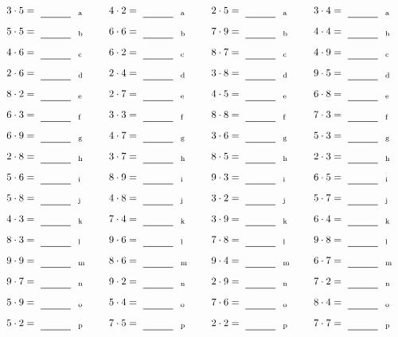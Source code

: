 \documentclass
[
  draft    = true,
  fontsize = 11pt,
  parskip  = half-
]
{scrartcl}
\begin{document}
\par\vfill\par
\begin{align*}
    \pline{3\cdot5}&=\rline{a}
  & \pline{4\cdot2}&=\rline{a}
  & \pline{2\cdot5}&=\rline{a}
  & \pline{3\cdot4}&=\rline{a} \\[1ex]
    \pline{5\cdot5}&=\rline{b}
  & \pline{6\cdot6}&=\rline{b}
  & \pline{7\cdot9}&=\rline{b}
  & \pline{4\cdot4}&=\rline{b} \\[1ex]
    \pline{4\cdot6}&=\rline{c}
  & \pline{6\cdot2}&=\rline{c}
  & \pline{8\cdot7}&=\rline{c}
  & \pline{4\cdot9}&=\rline{c} \\[1ex]
    \pline{2\cdot6}&=\rline{d}
  & \pline{2\cdot4}&=\rline{d}
  & \pline{3\cdot8}&=\rline{d}
  & \pline{9\cdot5}&=\rline{d} \\[1ex]
    \pline{8\cdot2}&=\rline{e}
  & \pline{2\cdot7}&=\rline{e}
  & \pline{4\cdot5}&=\rline{e}
  & \pline{6\cdot8}&=\rline{e} \\[1ex]
    \pline{6\cdot3}&=\rline{f}
  & \pline{3\cdot3}&=\rline{f}
  & \pline{8\cdot8}&=\rline{f}
  & \pline{7\cdot3}&=\rline{f} \\[1ex]
    \pline{6\cdot9}&=\rline{g}
  & \pline{4\cdot7}&=\rline{g}
  & \pline{3\cdot6}&=\rline{g}
  & \pline{5\cdot3}&=\rline{g} \\[1ex]
    \pline{2\cdot8}&=\rline{h}
  & \pline{3\cdot7}&=\rline{h}
  & \pline{8\cdot5}&=\rline{h}
  & \pline{2\cdot3}&=\rline{h} \\[1ex]
    \pline{5\cdot6}&=\rline{i}
  & \pline{8\cdot9}&=\rline{i}
  & \pline{9\cdot3}&=\rline{i}
  & \pline{6\cdot5}&=\rline{i} \\[1ex]
    \pline{5\cdot8}&=\rline{j}
  & \pline{4\cdot8}&=\rline{j}
  & \pline{3\cdot2}&=\rline{j}
  & \pline{5\cdot7}&=\rline{j} \\[1ex]
    \pline{4\cdot3}&=\rline{k}
  & \pline{7\cdot4}&=\rline{k}
  & \pline{3\cdot9}&=\rline{k}
  & \pline{6\cdot4}&=\rline{k} \\[1ex]
    \pline{8\cdot3}&=\rline{l}
  & \pline{9\cdot6}&=\rline{l}
  & \pline{7\cdot8}&=\rline{l}
  & \pline{9\cdot8}&=\rline{l} \\[1ex]
    \pline{9\cdot9}&=\rline{m}
  & \pline{8\cdot6}&=\rline{m}
  & \pline{9\cdot4}&=\rline{m}
  & \pline{6\cdot7}&=\rline{m} \\[1ex]
    \pline{9\cdot7}&=\rline{n}
  & \pline{9\cdot2}&=\rline{n}
  & \pline{2\cdot9}&=\rline{n}
  & \pline{7\cdot2}&=\rline{n} \\[1ex]
    \pline{5\cdot9}&=\rline{o}
  & \pline{5\cdot4}&=\rline{o}
  & \pline{7\cdot6}&=\rline{o}
  & \pline{8\cdot4}&=\rline{o} \\[1ex]
    \pline{5\cdot2}&=\rline{p}
  & \pline{7\cdot5}&=\rline{p}
  & \pline{2\cdot2}&=\rline{p}
  & \pline{7\cdot7}&=\rline{p}
\end{align*}
\end{document}
